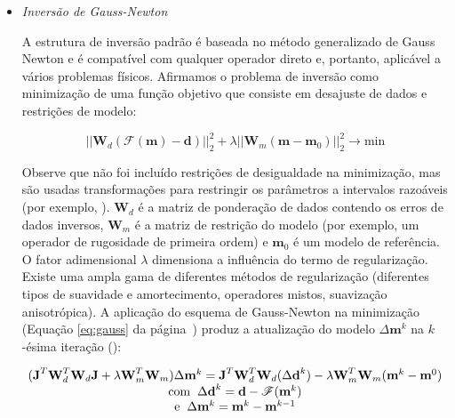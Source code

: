 \documentclass[a4paper, 12 pt]{article} %
\begin{document}
\begin{itemize}
	\item \textit{Inversão de Gauss-Newton}
	
	\hspace{0.5cm} A estrutura de inversão padrão é baseada no método generalizado de Gauss Newton e é compatível com qualquer operador direto e, portanto, aplicável a vários problemas físicos. Afirmamos o problema de inversão como minimização de uma função objetivo que consiste em desajuste de dados e restrições de modelo:
	
	\begin{equation}\label{eq:gauss}
	||\textbf{W}_{d}(\mathscr{F}(\textbf{m}) - \textbf{d})||_{2}^{2} + \lambda ||\textbf{W}_{m}(\textbf{m} - \textbf{m}_{0})||_{2}^{2} \rightarrow \textrm{min}
	\end{equation}
	
	\hspace{0.5cm} Observe que não foi incluído restrições de desigualdade na minimização, mas são usadas transformações para restringir os parâmetros a intervalos razoáveis (por exemplo, \citealp{kim2011unified}). $\textbf{W}_{d}$ é a matriz de ponderação de dados contendo os erros de dados inversos, $\textbf{W}_{m}$ é a matriz de restrição do modelo (por exemplo, um operador de rugosidade de primeira ordem) e $\textbf{m}_{0}$ é um modelo de referência. O fator adimensional $\lambda$ dimensiona a influência do termo de regularização. Existe uma ampla gama de diferentes métodos de regularização (diferentes tipos de suavidade e amortecimento, operadores mistos, suavização anisotrópica). A aplicação do esquema de Gauss-Newton na minimização (Equação \ref{eq:gauss} da página~\pageref{eq:gauss}) produz a atualização do modelo $\Delta \textbf{m}^{k}$ na $k$-ésima iteração (\citealp{park1991inversion}):
	
	\begin{equation}\label{eq:gauss-newton}
	\begin{matrix}
	
	(\textbf{J}^{T}\textbf{W}_{d}^{T}\textbf{W}_{d}\textbf{J}
	+ \lambda \textbf{W}_{m}^{T}\textbf{W}_{m})\Delta \textbf{m}^{k} = \textbf{J}^{T}\textbf{W}_{d}^{T}\textbf{W}_{d}(\Delta \textbf{d}^{k}) - \lambda \textbf{W}_{m}^{T}\textbf{W}_{m}(\textbf{m}^{k} - \textbf{m}^{0}) \\
	\textrm{com} \hspace{2mm} \Delta \textbf{d}^{k} = \textbf{d} - \mathscr{F}(\textbf{m}^{k}) \\ \textrm{e} \hspace{2mm} \Delta \textbf{m}^{k} = \textbf{m}^{k} - \textbf{m}^{k - 1}
	

\end{matrix}
\end{equation}
\end{itemize}
\end{document}
